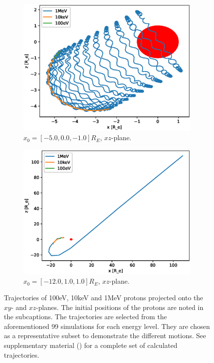 \begin{figure}
\begin{subfigure}[h]{0.45\textwidth}
        \includegraphics[width=\textwidth]{Figures/Trajectories/trajectories-xz-36.eps}
        \caption{$x_0 = [-5.0,0.0,-1.0]R_E$, $xz$-plane.}
        \label{fig:traj-g}
    \end{subfigure}
    \hfill
    \begin{subfigure}[h]{0.45\textwidth}
        \includegraphics[width=\textwidth]{Figures/Trajectories/trajectories-xz-98.eps}
        \caption{$x_0 = [-12.0,1.0,1.0]R_E$, $xz$-plane.}
        \label{fig:traj-h}
    \end{subfigure}
    \caption{Trajectories of 100eV, 10keV and 1MeV protons projected onto the $xy$- and 
    $xz$-planes. The initial positions of the protons are noted in the subcaptions. 
    The trajectories are selected from the aforementioned 99 simulations for each energy level.
    They are chosen as a representative subset to demonstrate the different motions. 
    See supplementary material (\cite{supplementary}) for a complete set of calculated trajectories.}
    \label{fig:trajectories}
\end{figure}